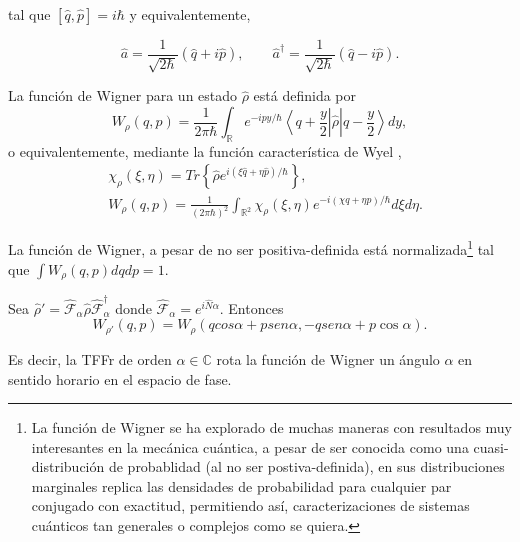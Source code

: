                 tal que $[\hat{q},\hat{p}] = i\hbar$ y equivalentemente,
                
                \begin{equation}
                    \hat{a} = \frac{1}{\sqrt{2\hbar}}\left(\hat{q}+i\hat{p} \right), \qquad \hat{a}^\dagger = \frac{1}{\sqrt{2\hbar}}\left(\hat{q}-i\hat{p} \right).
                \end{equation}

                La función de Wigner para un estado $\hat{\rho}$ está definida por
                \begin{equation}
                    W_\rho (q,p) = \frac{1}{2\pi \hbar} \int_{\mathbb{R}}e^{-ipy/\hbar}\left\langle q+ \frac{y}{2} \right|\hat{\rho}\left| q - \frac{y}{2} \right\rangle dy,
                \end{equation}
                o equivalentemente, mediante la función característica de Wyel \cite{hillery1984distribution,cahill1969ordered},
                \begin{align*}
                    & \chi_\rho (\xi,\eta) = Tr\left\{\hat{\rho} e^{i \left(\xi \hat{q} + \eta \hat{p} \right) /\hbar} \right\},\\
                    & W_\rho(q,p) = \frac{1}{\left(2\pi\hbar \right)^2} \int_{\mathbb{R}^2} \chi_\rho (\xi,\eta) e^{-i \left(\chi q + \eta p \right)/\hbar} d\xi d\eta.
                \end{align*}

                La función de Wigner, a pesar de no ser positiva-definida está normalizada\footnote{La función de Wigner se ha explorado de muchas maneras con resultados muy interesantes en la mecánica cuántica, a pesar de ser conocida como una cuasi-distribución de probablidad (al no ser postiva-definida), en sus distribuciones marginales replica las densidades de probabilidad para cualquier par conjugado con exactitud, permitiendo así, caracterizaciones de sistemas cuánticos tan generales o complejos como se quiera.} tal que $\int W_\rho (q,p)dqdp = 1$. 

                \begin{theorem}
                    Sea $\hat{\rho}' = \hat{\mathcal{F}}_\alpha \hat{\rho} \hat{\mathcal{F}}_\alpha^\dagger$ donde $\hat{\mathcal{F}}_\alpha = e^{i\hat{N}\alpha}$. Entonces
                    \begin{equation}\label{eq:Cap3TeoremaRotWigner}
                        W_{\rho '} (q,p) = W_\rho \left(qcos\alpha + p sen\alpha, -q sen\alpha + p\cos \alpha \right).
                    \end{equation}

                    Es decir, la TFFr de orden $\alpha \in \mathbb{C}$ rota la función de Wigner un ángulo $\alpha$ en sentido horario en el espacio de fase.
                \end{theorem}

